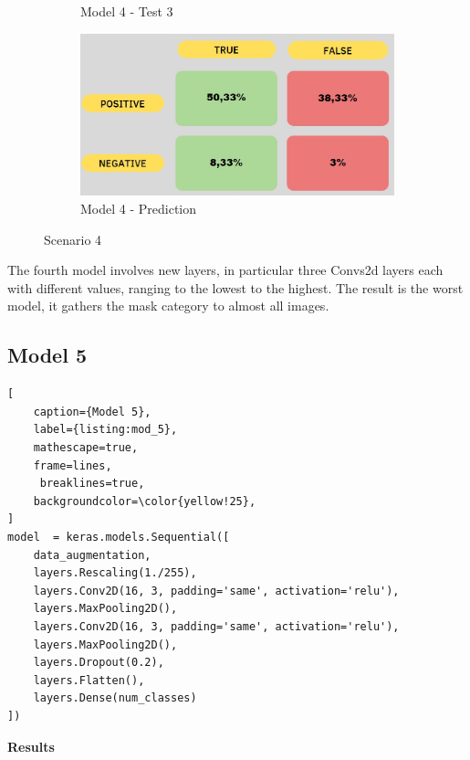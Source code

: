 \documentclass[a4paper,12pt]{article}
\begin{document}
\begin{figure}
\begin{subfigure}{6cm}
        \caption{ Model 4 - Test 3}
    \end{subfigure}
     \begin{subfigure}{6cm}
        \includegraphics[width=\linewidth]{images_latex/model4.jpg}
        \caption{ Model 4 - Prediction}
    \end{subfigure}
    \caption{Scenario 4}%
\end{figure}

The fourth model involves new layers, in particular three Convs2d layers each with different values, ranging to the lowest to the highest. 
The result is the worst model, it gathers the mask category to almost all images.
\subsection{Model 5}
\begin{lstlisting}[
    caption={Model 5},
    label={listing:mod_5},
    mathescape=true, 
    frame=lines,
     breaklines=true,
    backgroundcolor=\color{yellow!25},
]
model  = keras.models.Sequential([
    data_augmentation,
    layers.Rescaling(1./255),
    layers.Conv2D(16, 3, padding='same', activation='relu'),
    layers.MaxPooling2D(),
    layers.Conv2D(16, 3, padding='same', activation='relu'),
    layers.MaxPooling2D(),
    layers.Dropout(0.2),
    layers.Flatten(),
    layers.Dense(num_classes)
])
\end{lstlisting}

\textbf{Results}
\end{document}
